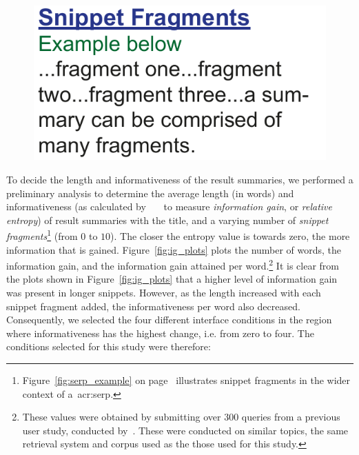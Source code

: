 \begin{figure}
    \begin{center}
    \vspace*{-6mm}
    \includegraphics[width=1\textwidth]{figures/ch7-fragments.pdf}
    \end{center}
    \vspace*{-4mm}
    \label{fig:fragments}
\end{figure}

To decide the length and informativeness of the result summaries, we performed a preliminary analysis to determine the average length (in words) and informativeness (as calculated by~~\citep{kullback1951information}~\citep{kullback1951information} to measure \emph{information gain}, or \emph{relative entropy}) of result summaries with the title, and a varying number of \emph{snippet fragments}\footnote{Figure~\ref{fig:serp_example} on page~\pageref{fig:serp_example} illustrates snippet fragments in the wider context of a~\gls{acr:serp}.} (from $0$ to $10$). The closer the entropy value is towards zero, the more information that is gained. Figure~\ref{fig:ig_plots} plots the number of words, the information gain, and the information gain attained per word.\footnote{These values were obtained by submitting over $300$ queries from a previous user study, conducted by~\cite{azzopardi2013query_cost}. These were conducted on similar topics, the same retrieval system and corpus used as the those used for this study.} It is clear from the plots shown in Figure~\ref{fig:ig_plots} that a higher level of information gain was present in longer snippets. However, as the length increased with each snippet fragment added, the informativeness per word also decreased. Consequently, we selected the four different interface conditions in the region where informativeness has the highest change, i.e. from zero to four. The conditions selected for this study were therefore:

